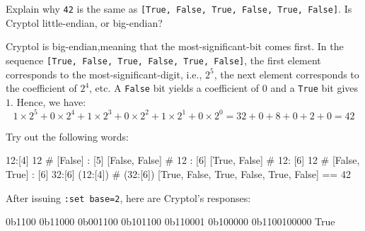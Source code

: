\begin{Exercise}\label{ex:words:0}
  Explain why {\tt 42} is the same as {\tt [True, False, True, False,
    True, False]}.  Is Cryptol little-endian, or
  big-endian?\indEndianness
\end{Exercise}
\begin{Answer}
  Cryptol is big-endian,\indEndianness meaning that the
  most-significant-bit comes first. In the sequence {\tt [True, False,
    True, False, True, False]}, the first element corresponds to the
  most-significant-digit, i.e., $2^5$, the next element corresponds to
  the coefficient of $2^4$, etc.  A {\tt False} bit yields a
  coefficient of $0$ and a {\tt True} bit gives $1$. Hence, we have:
$$1\times2^5 + 0\times2^4 + 1\times2^3 + 0\times2^2 + 1\times2^1 + 0\times2^0 = 32 + 0 + 8 + 0 + 2 + 0 = 42$$
\end{Answer}

\restartrepl
\begin{Exercise}\label{ex:words:1}
  Try out the following words: \indSettingBase
\begin{replinVerb}
  12:[4]
  12 # [False] : [5]
  [False, False] # 12 : [6]
  [True, False] # 12: [6]
  12 # [False, True] : [6]
  32:[6]
  (12:[4]) # (32:[6])
  [True, False, True, False, True, False] == 42
\end{replinVerb}
\end{Exercise}
\begin{Answer}
  After issuing {\tt :set base=2}, here are Cryptol's
  responses:\indSettingBase
\begin{reploutVerb}
  0b1100
  0b11000
  0b001100
  0b101100
  0b110001
  0b100000
  0b1100100000
  True
\end{reploutVerb}
\end{Answer}

